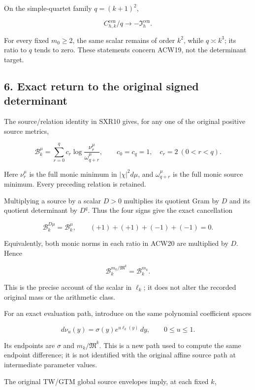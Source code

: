 \documentclass[11pt,a4paper]{article}
\begin{document}
On the simple-quartet family \(q=(k+1)^2\),

\[
C_{h,k}^{\mathrm{cen}}/q\longrightarrow-\mathfrak I_h^{\mathrm{cen}}.
\]

For every fixed \(m_0\ge2\), the same scalar remains of order \(k^2\), while \(q\asymp k^3\); its ratio to \(q\) tends to zero. These statements concern ACW19, not the determinant target.

\subsection{6. Exact return to the original signed determinant}\label{acw:exact-return-to-the-original-signed-determinant}

The source/relation identity in SXR10 gives, for any one of the original positive source metrics,

\[
\mathcal B_k^\mu
=\sum_{r=0}^q c_r
\log\frac{\nu_r^\mu}{\omega_{q+r}^\mu},
\qquad c_0=c_q=1,\quad c_r=2\ (0<r<q).
\tag{ACW20}
\]

Here \(\nu_r^\mu\) is the full monic minimum in \(|\chi|^2d\mu\), and \(\omega_{q+r}^\mu\) is the full monic source minimum. Every preceding relation is retained.

Multiplying a source by a scalar \(D>0\) multiplies its quotient Gram by \(D\) and its quotient determinant by \(D^q\). Thus the four signs give the exact cancellation

\[
\mathcal B_k^{D\mu}=\mathcal B_k^\mu,
\qquad (+1)+(+1)+(-1)+(-1)=0.
\]

Equivalently, both monic norms in each ratio in ACW20 are multiplied by \(D\). Hence

\[
\mathcal B_k^{m_k/\mathfrak M^k}=\mathcal B_k^{m_k}.
\tag{ACW21}
\]

This is the precise account of the scalar in \(\ell_k\); it does not alter the recorded original mass or the arithmetic class.

For an exact evaluation path, introduce on the same polynomial coefficient spaces

\[
d\nu_u(y)=\sigma(y)e^{u\ell_k(y)}\,dy,
\qquad0\le u\le1.
\tag{ACW22}
\]

Its endpoints are \(\sigma\) and \(m_k/\mathfrak M^k\). This is a new path used to compute the same endpoint difference; it is not identified with the original affine source path at intermediate parameter values.

The original TW/GTM global source envelopes imply, at each fixed \(k\),
\end{document}
